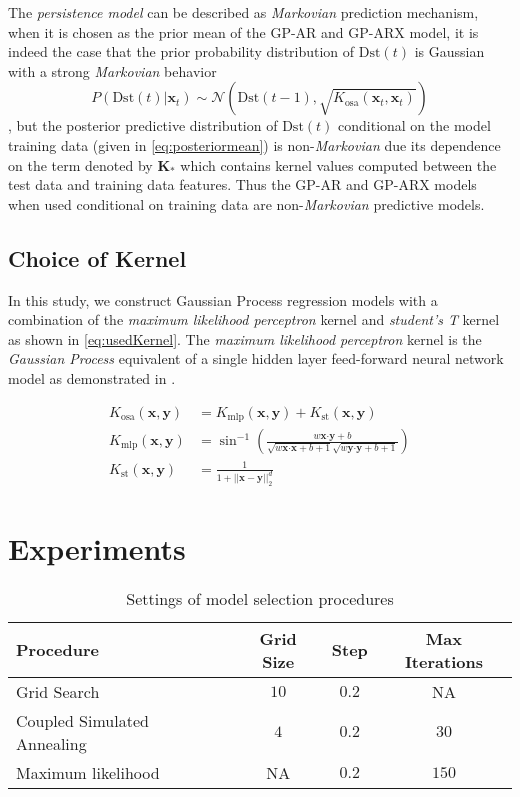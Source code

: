 The \emph{persistence model} can be described as \emph{Markovian} prediction mechanism, when it is 
chosen as the prior mean of the GP-AR and GP-ARX model, it is indeed the case that the prior 
probability distribution of $ \mathrm{Dst}(t)$ is Gaussian with a strong \emph{Markovian} behavior 
\[
    P(\mathrm{Dst}(t)|\mathbf{x}_t) \sim 
    \mathcal{N}(\mathrm{Dst}(t-1), \sqrt{K_{\text{osa}}(\mathbf{x}_t, \mathbf{x}_t)})
\], 
but the posterior predictive distribution of $\mathrm{Dst}(t)$ conditional on the model training 
data (given in \cref{eq:posteriormean}) is non-\emph{Markovian} due its dependence on the term 
denoted by $\mathbf{K}_{*}$ which contains kernel values computed between the test data and 
training data features. Thus the GP-AR and GP-ARX models when used conditional on training data are 
non-\emph{Markovian} predictive models.

\subsection{Choice of Kernel}

In this study, we construct Gaussian Process regression models with a combination of the 
\emph{maximum likelihood perceptron} kernel and \emph{student's T} kernel as shown in 
\cref{eq:usedKernel}. The \emph{maximum likelihood perceptron} kernel is the 
\emph{Gaussian Process} equivalent of a single hidden layer feed-forward neural network model as 
demonstrated in \citet{Neal:1996:BLN:525544}.

\begin{align}
    K_{\text{osa}}(\mathbf{x}, \mathbf{y}) & = K_{\text{mlp}}(\mathbf{x}, \mathbf{y}) + K_{\text{st}}(\mathbf{x}, \mathbf{y}) \label{eq:usedKernel} \\
    K_{\text{mlp}}(\mathbf{x}, \mathbf{y}) & = \sin^{-1}\left(\frac{w\mathbf{x}\boldsymbol{\cdot} \mathbf{y} + b}{\sqrt{w\mathbf{x}\boldsymbol{\cdot} \mathbf{x} + b + 1} \sqrt{w\mathbf{y}\boldsymbol{\cdot} \mathbf{y} + b + 1}}\right) \\
    K_{\text{st}}(\mathbf{x}, \mathbf{y}) & = \frac{1}{1 + ||\mathbf{x} - \mathbf{y}||_{2}^d}
\end{align}

\section{Experiments} \label{sec:modeltraining}

\begin{table}[ht]
    \centering
    \caption{Settings of model selection procedures}
    \begin{tabular}{l c c c}
    \hline
    \textbf{Procedure} & \textbf{Grid Size} & \textbf{Step} & \textbf{Max Iterations} \\
    \hline
    Grid Search & $10$ & $0.2$ & NA \\
    Coupled Simulated Annealing & $4$ & $0.2$ & $30$ \\
    Maximum likelihood & NA & $0.2$ & $150$\\
    \hline
    \end{tabular}
    \label{table:modelselection}
\end{table}

